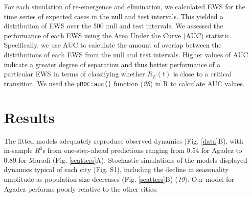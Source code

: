 \documentclass[3p]{elsarticle} %
\begin{document}
For each simulation of re-emergence and elimination, we calculated EWS
for the time series of expected cases in the null and test intervals.
This yielded a distribution of EWS over the 500 null and test intervals.
We assessed the performance of each EWS using the Area Under the Curve
(AUC) statistic. Specifically, we use AUC to calculate the amount of
overlap between the distributions of each EWS from the null and test
intervals. Higher values of AUC indicate a greater degree of separation
and thus better performance of a particular EWS in terms of classifying
whether \(R_E(t)\) is close to a critical transition. We used the
\texttt{pROC:auc()} function (\emph{26}) in R to calculate AUC values.

\section{Results}\label{results}

The fitted models adequately reproduce observed dynamics (Fig.
\ref{data}B), with in-sample \(R^2\)s from one-step-ahead predictions
ranging from 0.54 for Agadez to 0.89 for Maradi (Fig. \ref{scatters}A).
Stochastic simulations of the models displayed dynamics typical of each
city (Fig. S1), including the decline in seasonality amplitude as
population size decreases (Fig. \ref{scatters}B) (\emph{19}). Our model
for Agadez performs poorly relative to the other cities.
\end{document}
